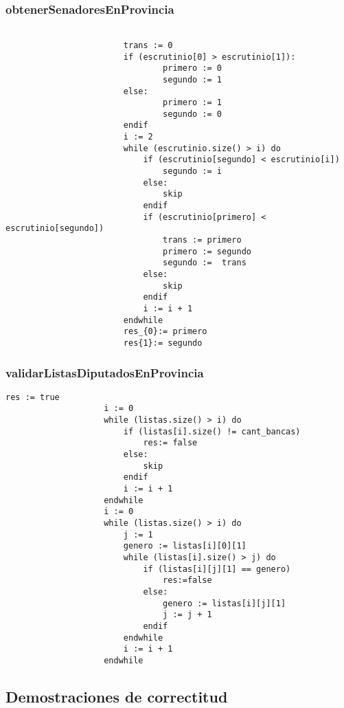 \documentclass[10pt,a4paper]{article}
\begin{document}
		\subsubsection{obtenerSenadoresEnProvincia}
			\begin{minipage}[t]{\textwidth}
				\begin{lstlisting}[caption={()},label=code:for]

						trans := 0
						if (escrutinio[0] > escrutinio[1]):
    							primero := 0
    							segundo := 1
						else:
    							primero := 1
    							segundo := 0
						endif
						i := 2
						while (escrutinio.size() > i) do
							if (escrutinio[segundo] < escrutinio[i])
								segundo := i
							else:
								skip
							endif
							if (escrutinio[primero] < escrutinio[segundo])
								trans := primero
								primero := segundo
								segundo :=  trans
							else:
								skip
							endif
							i := i + 1
						endwhile	
						res_{0}:= primero
                        res{1}:= segundo
				\end{lstlisting}
			\end{minipage}
	
		\subsubsection{validarListasDiputadosEnProvincia}
			\begin{minipage}[t]{\textwidth}
				\begin{lstlisting}[caption={()},label=code:for]
					res := true
					i := 0
					while (listas.size() > i) do
						if (listas[i].size() != cant_bancas) 
							res:= false
						else:
							skip
						endif
						i := i + 1
					endwhile
					i := 0
					while (listas.size() > i) do
                        j := 1
						genero := listas[i][0][1]
						while (listas[i].size() > j) do
							if (listas[i][j][1] == genero) 
								res:=false
							else:
								genero := listas[i][j][1]
								j := j + 1
							endif
					    endwhile
						i := i + 1
					endwhile
				\end{lstlisting}
			\end{minipage}
		
	\subsection{Demostraciones de correctitud}
\end{document}

